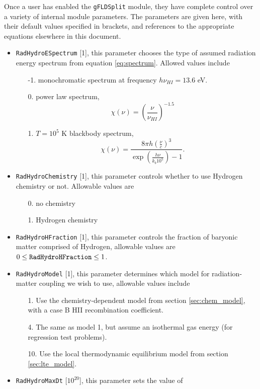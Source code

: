 \documentclass[letterpaper,10pt]{article}
\renewcommand{\(}{\left(}
\renewcommand{\)}{\right)}
\begin{document}
Once a user has enabled the {\tt gFLDSplit} module, they have
complete control over a variety of internal module parameters.  The
parameters are given here, with their default values specified in
brackets, and references to the appropriate equations elsewhere in
this document. 
\begin{itemize}
\item {\tt RadHydroESpectrum} [1], this parameter chooses the type of
  assumed radiation energy spectrum from equation \eqref{eq:spectrum}.
  Allowed values include
  \begin{itemize}
  \item[-1.] monochromatic spectrum at frequency $h\nu_{HI} = 13.6$ eV.
  \item[0.] power law spectrum,
    \[
      \chi(\nu) = \left(\frac{\nu}{\nu_{HI}}\right)^{-1.5}
    \]
  \item[1.] $T=10^5$ K blackbody spectrum, 
    \[
       \chi(\nu) = \frac{8 \pi h
         \left(\frac{\nu}{c}\right)^3}{\exp\left(\frac{h\nu}{k_b 10^5}\right)-1}.
    \]
  \end{itemize}
\item {\tt RadHydroChemistry} [1], this parameter controls whether to
  use Hydrogen chemistry or not.  Allowable values are
  \begin{itemize}
  \item[0.] no chemistry
  \item[1.] Hydrogen chemistry
  \end{itemize}
\item {\tt RadHydroHFraction} [1], this parameter controls the
  fraction of baryonic matter comprised of Hydrogen, allowable
  values are $0 \le {\tt RadHydroHFraction} \le 1$.
\item {\tt RadHydroModel} [1], this parameter determines which model
  for radiation-matter coupling we wish to use, allowable values
  include
  \begin{itemize}
  \item[1.] Use the chemistry-dependent model from section
    \ref{sec:chem_model}, with a case B HII recombination coefficient.
  \item[4.] The same as model 1, but assume an isothermal gas energy
    (for regression test problems).
  \item[10.] Use the local thermodynamic equilibrium model from section
    \ref{sec:lte_model}.
  \end{itemize}
\item {\tt RadHydroMaxDt} [$10^{20}$], this parameter sets the value of

\end{itemize}
\end{document}
